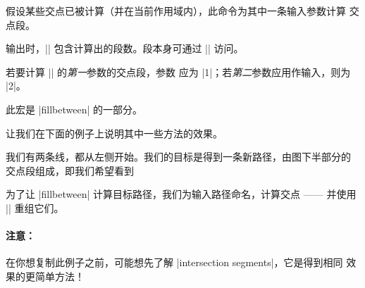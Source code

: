 \begin{command}{\pgfcomputeintersectionsegments\allowbreak{}}
    假设某些交点已被计算（并在当前作用域内），此命令为其中一条输入参数计算
    交点段。

    输出时，|\pgfretval| 包含计算出的段数。段本身可通过
    |\pgfgetintersectionsegmentpath| 访问。

    若要计算 |\pgfintersectionofpaths| 的\emph{第一}参数的交点段，参数
     应为 |1|；若\emph{第二}参数应用作输入，则为 |2|。

    此宏是 |fillbetween| 的一部分。

    让我们在下面的例子上说明其中一些方法的效果。
\begin{codeexample}[]
\end{codeexample}
    我们有两条线，都从左侧开始。我们的目标是得到一条新路径，由图下半部分的
    交点段组成，即我们希望看到
\begin{codeexample}[]
\end{codeexample}

    为了让 |fillbetween| 计算目标路径，我们为输入路径命名，计算交点 —— 并使用
    |\pgfcomputeintersectionsegments| 重组它们。


    \paragraph{注意：}

    在你想复制此例子之前，可能想先了解 |intersection segments|，它是得到相同
    效果的更简单方法！
\begin{codeexample}[vbox]
\end{codeexample}
\end{command}
